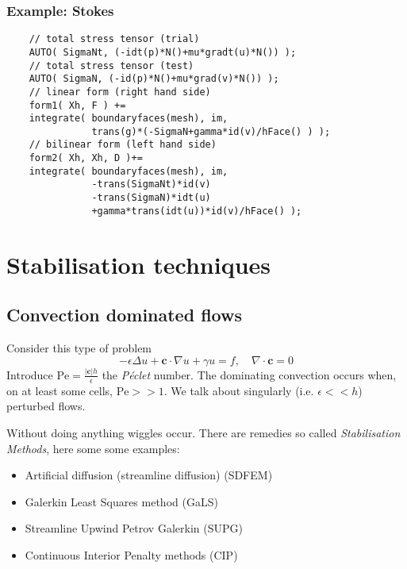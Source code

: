 \subsubsection[containsverbatim]{Example: Stokes}
  \begin{lstlisting}
    // total stress tensor (trial)
    AUTO( SigmaNt, (-idt(p)*N()+mu*gradt(u)*N()) );
    // total stress tensor (test)
    AUTO( SigmaN, (-id(p)*N()+mu*grad(v)*N()) );
    // linear form (right hand side)
    form1( Xh, F ) +=
    integrate( boundaryfaces(mesh), im,
               trans(g)*(-SigmaN+gamma*id(v)/hFace() ) );
    // bilinear form (left hand side)
    form2( Xh, Xh, D )+=
    integrate( boundaryfaces(mesh), im,
               -trans(SigmaNt)*id(v)
               -trans(SigmaN)*idt(u)
               +gamma*trans(idt(u))*id(v)/hFace() );
  \end{lstlisting}



\section{Stabilisation techniques}

\subsection{Convection dominated flows}

Consider this type of problem
\begin{equation}
  \label{notes:eq:46}
  -\epsilon \Delta u + \mathbf{c} \cdot \nabla u + \gamma u = f,\quad \nabla \cdot \mathbf{c} = 0
\end{equation}
Introduce $\mathrm{Pe}=\frac{|\mathbf{c}|h}{\epsilon}$ the \emph{Péclet}
number. The dominating convection occurs when, on at least some cells,
$\mathrm{Pe} >> 1$. We talk about singularly (i.e. $\epsilon << h$)
perturbed flows.

Without doing anything wiggles occur. There are remedies  so
called \emph{Stabilisation Methods}, here some some examples:
\begin{itemize}
\item Artificial diffusion (streamline diffusion) (SDFEM)
\item Galerkin Least Squares method (GaLS)
\item Streamline Upwind Petrov Galerkin (SUPG)
\item Continuous Interior Penalty methods (CIP)
\end{itemize}

